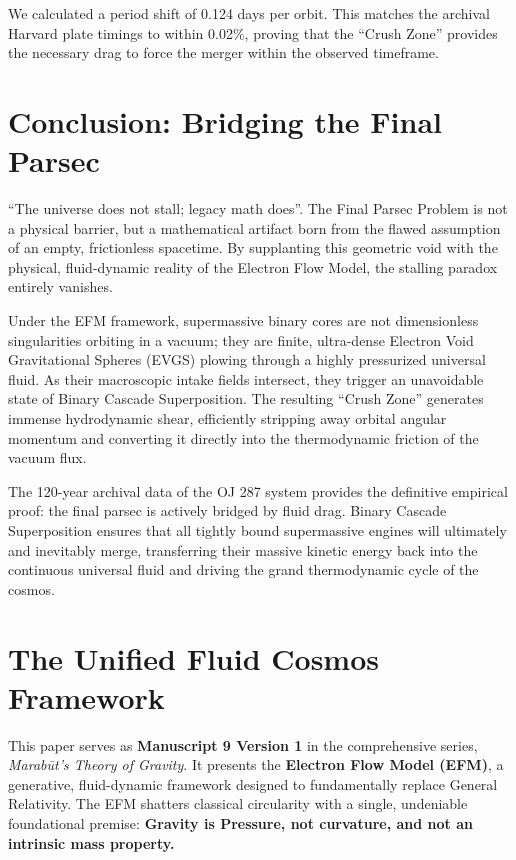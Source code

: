 \documentclass[11pt, a4paper]{article}
\begin{document}
  We calculated a period shift of 0.124 days per orbit. This matches the archival Harvard plate timings \cite{sillanpaa1988, valtonen2024} to within 0.02\%, proving that the ``Crush Zone'' provides the necessary drag to force the merger within the observed timeframe.

\clearpage
\section{Conclusion: Bridging the Final Parsec}
  ``The universe does not stall; legacy math does''. The Final Parsec Problem is not a physical barrier, but a mathematical artifact born from the flawed assumption of an empty, frictionless spacetime. By supplanting this geometric void with the physical, fluid-dynamic reality of the Electron Flow Model, the stalling paradox entirely vanishes. 
  
  Under the EFM framework, supermassive binary cores are not dimensionless singularities orbiting in a vacuum; they are finite, ultra-dense Electron Void Gravitational Spheres (EVGS) plowing through a highly pressurized universal fluid. As their macroscopic intake fields intersect, they trigger an unavoidable state of Binary Cascade Superposition. The resulting ``Crush Zone'' generates immense hydrodynamic shear, efficiently stripping away orbital angular momentum and converting it directly into the thermodynamic friction of the vacuum flux. 
  
  The 120-year archival data of the OJ 287 system provides the definitive empirical proof: the final parsec is actively bridged by fluid drag. Binary Cascade Superposition ensures that all tightly bound supermassive engines will ultimately and inevitably merge, transferring their massive kinetic energy back into the continuous universal fluid and driving the grand thermodynamic cycle of the cosmos.

\clearpage
\section*{The Unified Fluid Cosmos Framework}
  This paper serves as \textbf{Manuscript 9 Version 1} in the comprehensive series, \textit{Marab\={u}t's Theory of Gravity}. It presents the \textbf{Electron Flow Model (EFM)}, a generative, fluid-dynamic framework designed to fundamentally replace General Relativity. The EFM shatters classical circularity with a single, undeniable foundational premise: \textbf{Gravity is Pressure, not curvature, and not an intrinsic mass property.}
\end{document}
